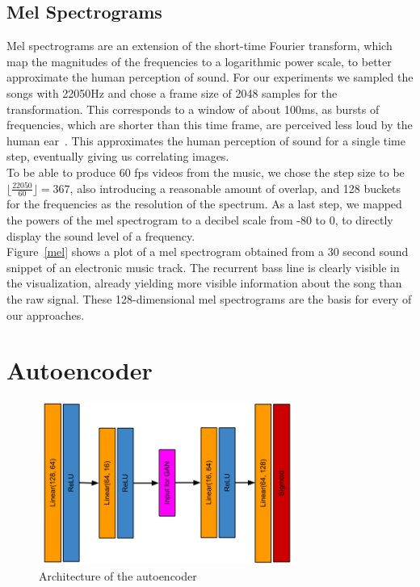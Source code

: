     \subsection{Mel Spectrograms}
    \indent Mel spectrograms are an extension of the short-time Fourier transform, which map the magnitudes of the frequencies to a logarithmic power scale, to better approximate the human perception of sound.
    For our experiments we sampled the songs with 22050Hz and chose a frame size of 2048 samples for the transformation.
    This corresponds to a window of about 100ms, as bursts of frequencies, which are shorter than this time frame, are perceived less loud by the human ear~\cite{Acoustics}.
    This approximates the human perception of sound for a single time step, eventually giving us correlating images.\\
    To be able to produce 60 fps videos from the music, we chose the step size to be $\lfloor \frac{22050}{60} \rfloor = 367$, also introducing a reasonable amount of overlap, and 128 buckets for the frequencies as the resolution of the spectrum.
    As a last step, we mapped the powers of the mel spectrogram to a decibel scale from -80 to 0, to directly display the sound level of a frequency.\\ 
    \indent Figure~\ref{mel} shows a plot of a mel spectrogram obtained from a 30 second sound snippet of an electronic music track. 
    The recurrent bass line is clearly visible in the visualization, already yielding more visible information about the song than the raw signal.
    These 128-dimensional mel spectrograms are the basis for every of our approaches.

\section{Autoencoder}
    
    \begin{figure}[!t]
    \centering
    \includegraphics[width=0.75\textwidth]{images/autoencoder}    
    \caption{Architecture of the autoencoder}
    \label{autoencoder}
    \end{figure}
    
